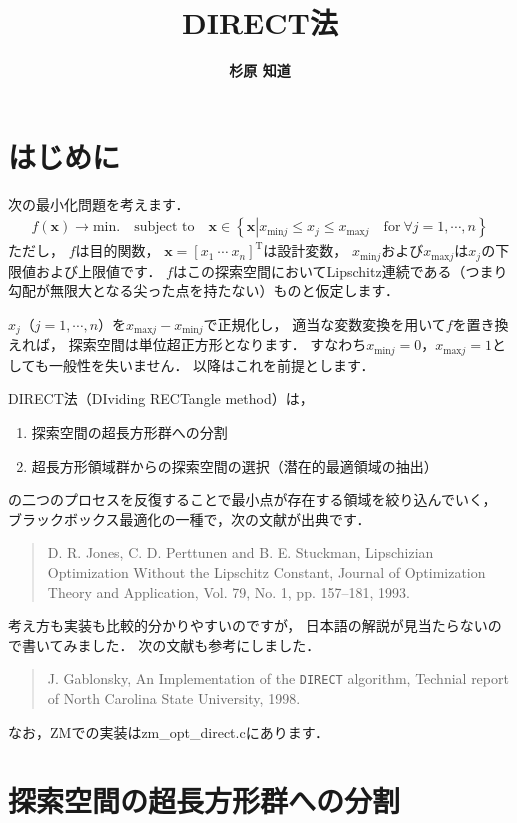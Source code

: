 ﻿\documentclass{jsarticle}
\title{\bf DIRECT法}
\author{\Large{\bf 杉原 知道}}
\begin{document}
\maketitle

\section{はじめに}

次の最小化問題を考えます．
\begin{align*}
f(\bm{x})\rightarrow\mbox{min.}\quad\mbox{subject to}\quad \bm{x}\in\left\{
\bm{x}\left|
x_{\mathrm{min}j}\leq x_{j}\leq x_{\mathrm{max}j}\quad\mbox{for}~\forall j=1,\cdots,n
\right.\right\}
\end{align*}
ただし，
$f$は目的関数，
$\bm{x}=[x_{1}~\cdots~x_{n}]^{\mathrm{T}}$は設計変数，
$x_{\mathrm{min}j}$および$x_{\mathrm{max}j}$は$x_{j}$の下限値および上限値です．
$f$はこの探索空間においてLipschitz連続である（つまり勾配が無限大となる尖った点を持たない）ものと仮定します．

$x_{j}$（$j=1,\cdots,n$）を$x_{\mathrm{max}j}-x_{\mathrm{min}j}$で正規化し，
適当な変数変換を用いて$f$を置き換えれば，
探索空間は単位超正方形となります．
すなわち$x_{\mathrm{min}j}=0$，$x_{\mathrm{max}j}=1$としても一般性を失いません．
以降はこれを前提とします．

DIRECT法（DIviding RECTangle method）は，
\begin{enumerate}
\item{探索空間の超長方形群への分割}
\item{超長方形領域群からの探索空間の選択（潜在的最適領域の抽出）}
\end{enumerate}
の二つのプロセスを反復することで最小点が存在する領域を絞り込んでいく，
ブラックボックス最適化の一種で，次の文献が出典です．
\begin{quote}
D. R. Jones, C. D. Perttunen and B. E. Stuckman,
Lipschizian Optimization Without the Lipschitz Constant,
Journal of Optimization Theory and Application, Vol. 79, No. 1, pp. 157--181, 1993.
\end{quote}
考え方も実装も比較的分かりやすいのですが，
日本語の解説が見当たらないので書いてみました．
次の文献も参考にしました．
\begin{quote}
J. Gablonsky, An Implementation of the {\tt DIRECT} algorithm, Technial report of North Carolina State University, 1998.
\end{quote}
なお，ZMでの実装はzm\_opt\_direct.cにあります．


\section{探索空間の超長方形群への分割}
\end{document}

